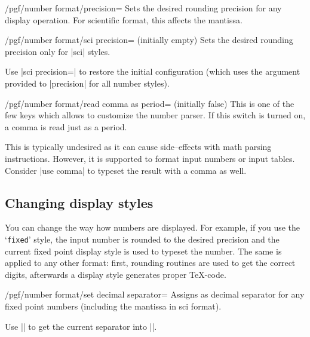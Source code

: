 \begin{key}{/pgf/number format/precision=}
  Sets the desired rounding precision for any display operation. For
  scientific format, this affects the mantissa. 
\end{key}

\begin{key}{/pgf/number format/sci precision= (initially empty)}
  Sets the desired rounding precision only for |sci| styles.

  Use |sci precision={}| to restore the initial configuration (which
  uses the argument provided to |precision| for all number styles). 
\end{key}

\begin{key}{/pgf/number format/read comma as period= (initially false)}
	This is one of the few keys which allows to customize the number parser. If this switch is turned on, a comma is read just as a period.
\begin{codeexample}[]
\end{codeexample}
	This is typically undesired as it can cause side--effects with math parsing instructions. However, it is supported to format input numbers or input tables. Consider |use comma| to typeset the result with a comma as well.
\begin{codeexample}[]
\end{codeexample}
\end{key}

\subsection{Changing display styles}%
\label{sec:number:styles}%

You can change the way how numbers are displayed. For example, if you
use the `\texttt{fixed}' style, the input number is rounded to the
desired precision and the current fixed point display style is used to
typeset the number. The same is applied to any other format: first,
rounding routines are used to get the correct digits, afterwards a
display style generates proper \TeX-code. 

\begin{key}{/pgf/number format/set decimal separator=}
  Assigns  as decimal separator for any fixed point numbers
  (including the mantissa in sci format). 

  Use |\value| 
  to get the current separator into |\value|. 
\end{key}

